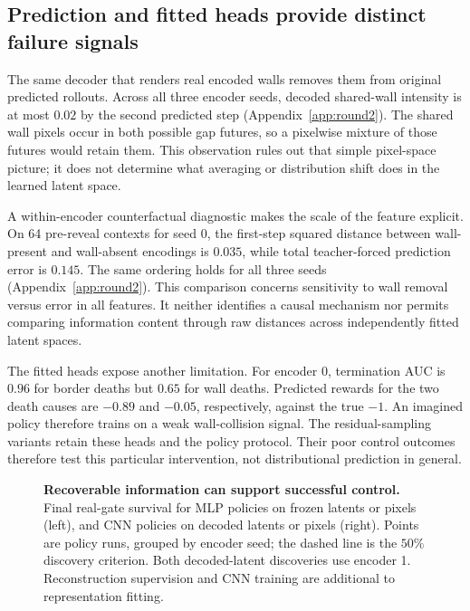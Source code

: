 \subsection{Prediction and fitted heads provide distinct failure signals}
\label{app:results-mean}

The same decoder that renders real encoded walls removes them from original predicted rollouts.
Across all three encoder seeds, decoded shared-wall intensity is at most $0.02$ by the second
predicted step (Appendix~\ref{app:round2}). The shared wall pixels occur in both possible gap futures,
so a pixelwise mixture of those futures would retain them. This observation rules out that simple
pixel-space picture; it does not determine what averaging or distribution shift does in the learned
latent space.

A within-encoder counterfactual diagnostic makes the scale of the feature explicit. On 64 pre-reveal
contexts for seed 0, the first-step squared distance between wall-present and wall-absent encodings
is $0.035$, while total teacher-forced prediction error is $0.145$. The same ordering holds for all
three seeds (Appendix~\ref{app:round2}). This comparison concerns sensitivity to wall removal versus
error in all features. It neither identifies a causal mechanism nor permits comparing information
content through raw distances across independently fitted latent spaces.

The fitted heads expose another limitation. For encoder 0, termination AUC is $0.96$ for border
deaths but $0.65$ for wall deaths. Predicted rewards for the two death causes are $-0.89$ and $-0.05$,
respectively, against the true $-1$. An imagined policy therefore trains on a weak wall-collision
signal. The residual-sampling variants retain these heads and the policy protocol. Their poor control
outcomes therefore test this particular intervention, not distributional prediction in general.

\begin{figure}[t]
\centering
{}
\caption{\textbf{Recoverable information can support successful control.} Final real-gate survival
for MLP policies on frozen latents or pixels (left), and CNN policies on decoded latents or pixels
(right). Points are policy runs, grouped by encoder seed; the dashed line is the $50\%$ discovery criterion. Both decoded-latent discoveries
use encoder 1. Reconstruction supervision and CNN training are additional to representation fitting.}
\label{fig:representation}
\end{figure}
